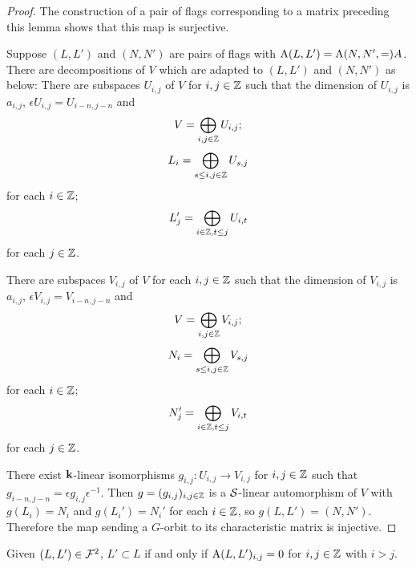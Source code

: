 \documentclass[a4paper, 11pt]{report}
\begin{document}
\begin{proof}
The construction of a pair of flags corresponding to a matrix preceding this lemma shows that this map is surjective.

Suppose $(L,L')$ and $(N,N')$ are pairs of flags with $\operatorname{A}(L,L')=\operatorname{A}(N,N',=)A$. There are decompositions of $V$ which are adapted to $(L,L')$ and $(N,N')$ as below:
There are subspaces $U_{i,j}$ of $V$ for $i,j\in\mathbb{Z}$ such that the dimension of $U_{i,j}$ is $a_{i,j}$, $\epsilon U_{i,j}=U_{i-n,j-n}$ and
\begin{equation*}
V=\bigoplus_{i,j\in\mathbb{Z}} U_{i,j};
\end{equation*}
\begin{equation*}
L_i = \bigoplus_{s\le i,j\in\mathbb{Z}} U_{s,j}
\end{equation*}
for each $i\in\mathbb{Z}$;
\begin{equation*}
L_j' = \bigoplus_{i\in\mathbb{Z},t\le j} U_{i,t}
\end{equation*}
for each $j\in\mathbb{Z}$.

There are subspaces $V_{i,j}$ of $V$ for each $i,j\in\mathbb{Z}$ such that the dimension of $V_{i,j}$ is $a_{i,j}$, $\epsilon V_{i,j} = V_{i-n,j-n}$ and
\begin{equation*}
V = \bigoplus_{i,j\in\mathbb{Z}} V_{i,j};
\end{equation*}
\begin{equation*}
N_i = \bigoplus_{s\le i,j\in\mathbb{Z}} V_{s,j}
\end{equation*}
for each $i\in\mathbb{Z}$;
\begin{equation*}
N_j' = \bigoplus_{i\in\mathbb{Z},t\le j} V_{i,t}
\end{equation*}
for each $j\in\mathbb{Z}$.

There exist $\mathbf{k}$-linear isomorphisms $g_{i,j}\colon U_{i,j}\to V_{i,j}$ for $i,j\in\mathbb{Z}$ such that $g_{i-n,j-n}=\epsilon g_{i,j}\epsilon^{-1}$. Then $g=(g_{i,j})_{i,j\in\mathbb{Z}}$ is a $\mathcal{S}$-linear automorphism of $V$ with $g(L_i)=N_i$ and $g(L_i')=N_i'$ for each $i\in\mathbb{Z}$, so $g(L,L')=(N,N')$. Therefore the map sending a $G$-orbit to its characteristic matrix is injective.
\end{proof}

\begin{lemma}
Given $(L,L')\in\mathcal{F}^2$, $L'\subset L$ if and only if $\operatorname{A}(L,L')_{i,j}=0$ for $i,j\in\mathbb{Z}$ with $i>j$.
\end{lemma}
\end{document}
